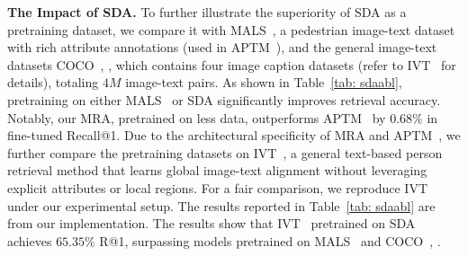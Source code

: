 \noindent \textbf{The Impact of SDA.} 
To further illustrate the superiority of SDA as a pretraining dataset, we compare it with MALS~\cite{yang2023towards}, a pedestrian image-text dataset with rich attribute annotations (used in APTM~\cite{yang2023towards}), and the general image-text datasets COCO~\cite{lin2014microsoft}, \etc, which contains four image caption datasets (refer to IVT~\cite{shu2022see} for details), totaling $4M$ image-text pairs. 
As shown in Table~\ref{tab: sdaabl}, pretraining on either MALS~\cite{yang2023towards} or SDA significantly improves retrieval accuracy. 
Notably, our MRA, pretrained on less data, outperforms APTM~\cite{yang2023towards} by $0.68\%$ in fine-tuned Recall@1.
Due to the architectural specificity of MRA and APTM~\cite{yang2023towards}, we further compare the pretraining datasets on IVT~\cite{shu2022see}, a general text-based person retrieval method that learns global image-text alignment without leveraging explicit attributes or local regions. 
For a fair comparison, we reproduce IVT~\cite{shu2022see} under our experimental setup. The results reported in Table~\ref{tab: sdaabl} are from our implementation.
The results show that IVT~\cite{shu2022see} pretrained on SDA achieves $65.35\%$ R@1, surpassing models pretrained on MALS~\cite{yang2023towards} and COCO~\cite{lin2014microsoft}, \etc.

